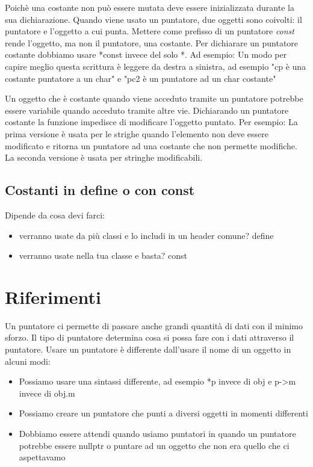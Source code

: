 \documentclass[11pt,a4paper]{book}
\begin{document}
Poichè una costante non può essere mutata deve essere inizializzata durante la sua dichiarazione.
\label{code: 094}
Quando viene usato un puntatore, due oggetti sono coivolti: il puntatore e l'oggetto a cui punta. Mettere come prefisso di un puntatore \emph{const} rende l'oggetto, ma non il puntatore, una costante. Per dichiarare un puntatore costante dobbiamo usare *const invece del solo *. Ad esempio:
\label{code: 093}
Un modo per capire meglio questa scrittura è leggere da destra a sinistra, ad esempio "cp è una costante puntatore a un char" e "pc2 è un puntatore ad un char costante"

Un oggetto che è costante quando viene acceduto tramite un puntatore potrebbe essere variabile quando acceduto tramite altre vie. Dichiarando un puntatore costante la funzione impedisce di modificare l'oggetto puntato. Per esempio:
\label{code: 095}
La prima versione è usata per le strighe quando l'elemento non deve essere modificato e ritorna un puntatore ad una costante che non permette modifiche. La seconda versione è usata per stringhe modificabili.

\subsection{Costanti in define o con const}
Dipende da cosa devi farci:
\begin{itemize}
	\item verranno usate da più classi e lo includi in un header comune? define
	\item verranno usate nella tua classe e basta? const
\end{itemize}

\section{Riferimenti}
Un puntatore ci permette di passare anche grandi quantità di dati con il minimo sforzo. Il tipo di puntatore determina cosa si possa fare con i dati attraverso il puntatore. Usare un puntatore è differente dall'usare il nome di un oggetto in alcuni modi:
\begin{itemize}
	\item Possiamo usare una sintassi differente, ad esempio *p invece di obj e p->m invece di obj.m
	\item Possiamo creare un puntatore che punti a diversi oggetti in momenti differenti
	\item Dobbiamo essere attendi quando usiamo puntatori in quando un puntatore potrebbe essere nullptr o puntare ad un oggetto che non era quello che ci aspettavamo
\end{itemize}
\end{document}
